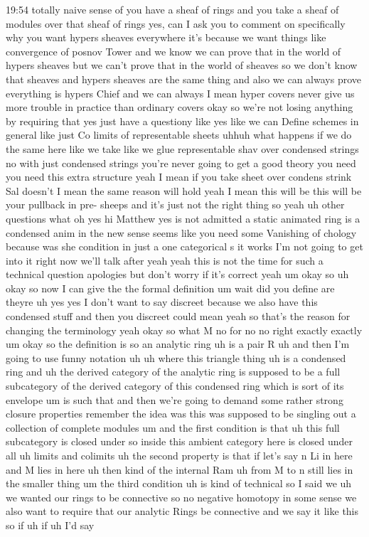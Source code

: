 \begin{unfinished}{19:54}
totally naive sense of you have a sheaf of rings and you take a sheaf of modules over that sheaf of rings yes, can I ask you to comment on specifically why you want hypers sheaves everywhere it's because we want things like convergence of posnov Tower and we know we can prove that in the world of hypers sheaves but we can't prove that in the world of sheaves so we don't know that sheaves and hypers sheaves are the same thing and also we can always prove everything is hypers Chief and we can always I mean hyper covers never give us more trouble in practice than ordinary covers okay so we're not losing anything by requiring that yes just have a questiony like yes like we can Define schemes in general like just Co limits of representable sheets uhhuh what happens if we do the same here like we take like we glue representable shav over condensed strings no with just condensed strings you're never going to get a good theory you need you need this extra structure yeah I mean if you take sheet over condens strink Sal doesn't I mean the same reason will hold yeah I mean this will be this will be your pullback in pre- sheeps and it's just not the right thing so yeah uh other questions what oh yes hi Matthew yes is not admitted a static animated ring is a condensed anim in the new sense seems like you need some Vanishing of chology because was she condition in just a one categorical s it works I'm not going to get into it right now we'll talk after yeah yeah this is not the time for such a technical question apologies but don't worry if it's correct yeah um okay so uh okay so now I can give the the formal definition um wait did you define are theyre uh yes yes I don't want to say discreet because we also have this condensed stuff and then you discreet could mean yeah so that's the reason for changing the terminology yeah okay so what M no for no no right exactly exactly um okay so the definition is so an analytic ring uh is a pair R uh and then I'm going to use funny notation uh uh where this triangle thing uh is a condensed ring and uh the derived category of the analytic ring is supposed to be a full subcategory of the derived category of this condensed ring which is sort of its envelope um is such that and then we're going to demand some rather strong closure properties remember the idea was this was supposed to be singling out a collection of complete modules um and the first condition is that uh this full subcategory is closed under so inside this ambient category here is closed under all uh limits and colimits uh the second property is that if let's say n Li in here and M lies in here uh then kind of the internal Ram uh from M to n still lies in the smaller thing um the third condition uh is kind of technical so I said we uh we wanted our rings to be connective so no negative homotopy in some sense we also want to require that our analytic Rings be connective and we say it like this so if uh if uh I'd say


\end{unfinished}
